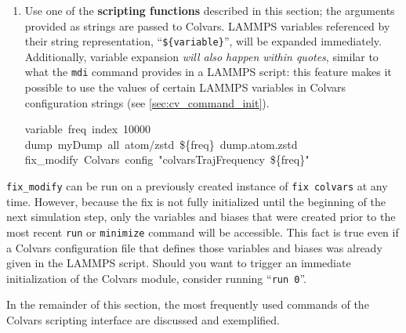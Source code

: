 {{\begin{enumerate}
\item Use one of the \textbf{scripting functions} described in this section; the arguments provided as strings are passed to Colvars.  LAMMPS variables referenced by their string representation, ``\texttt{\$\{variable\}}'', will be expanded immediately.  Additionally, variable expansion \emph{will also happen within quotes}, similar to what the \texttt{mdi} command provides in a LAMMPS script: this feature makes it possible to use the values of certain LAMMPS variables in Colvars configuration strings (see \ref{sec:cv_command_init}).
\begin{mdexampleinput}
\-variable~freq~index~10000\\
\-dump~myDump~all~atom/zstd~\$\{freq\}~dump.atom.zstd\\
\-fix\_modify~Colvars~config~"colvarsTrajFrequency~\$\{freq\}"
\end{mdexampleinput}

\end{enumerate}


\texttt{fix\_modify} can be run on a previously created instance of \texttt{fix colvars} at any time.
However, because the fix is not fully initialized until the beginning of the next simulation step, only the variables and biases that were created prior to the most recent \texttt{run} or \texttt{minimize} command will be accessible.
This fact is true even if a Colvars configuration file that defines those variables and biases was already given in the LAMMPS script.
Should you want to trigger an immediate initialization of the Colvars module, consider running ``\texttt{run 0}''.
}

\ifdefined{}\fi %

In the remainder of this section, the most frequently used commands of the Colvars scripting interface are discussed and exemplified.
\ifdefined{}
\\
\fi


}
